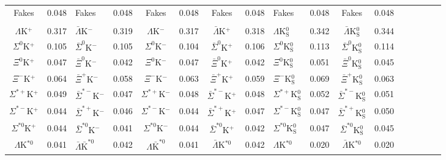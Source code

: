\documentclass[/home/jesse/Analysis/FemtoAnalysis/AnalysisNotes/AnalysisNoteJBuxton.tex]{subfiles}
\begin{document}
\begin{landscape}
\begin{table}[htbp]
{\begin{tabular}{|c|cV{5.0}c|cV{5.0}c|cV{5.0}c|cV{5.0}c|cV{5.0}c|c|}
  Fakes & 0.048 & Fakes & 0.048 & Fakes & 0.048 & Fakes & 0.048 & Fakes & 0.048 & Fakes & 0.048 \\
  
   \\
  $\Lambda$K$^{+}$ & 0.317 & $\bar{\Lambda}$K$^{-}$ & 0.319 & $\Lambda$K$^{-}$ & 0.317 & $\bar{\Lambda}$K$^{+}$ & 0.318 & $\Lambda$K$^{0}_{\mathrm{S}}$ & 0.342 & $\bar{\Lambda}$K$^{0}_{\mathrm{S}}$ & 0.344 \\
  
  $\Sigma^{0}$K$^{+}$ & 0.105 & $\bar{\Sigma}^{0}$K$^{-}$ & 0.105 & $\Sigma^{0}$K$^{-}$ & 0.104 & $\bar{\Sigma}^{0}$K$^{+}$ & 0.106 & $\Sigma^{0}$K$^{0}_{\mathrm{S}}$ & 0.113 & $\bar{\Sigma}^{0}$K$^{0}_{\mathrm{S}}$ & 0.114 \\
  
  $\Xi^{0}$K$^{+}$ & 0.047 & $\bar{\Xi}^{0}$K$^{-}$ & 0.042 & $\Xi^{0}$K$^{-}$ & 0.047 & $\bar{\Xi}^{0}$K$^{+}$ & 0.042 & $\Xi^{0}$K$^{0}_{\mathrm{S}}$ & 0.051 & $\bar{\Xi}^{0}$K$^{0}_{\mathrm{S}}$ & 0.045 \\
  
  $\Xi^{-}$K$^{+}$ & 0.064 & $\bar{\Xi}^{+}$K$^{-}$ & 0.058 & $\Xi^{-}$K$^{-}$ & 0.063 & $\bar{\Xi}^{+}$K$^{+}$ & 0.059 & $\Xi^{-}$K$^{0}_{\mathrm{S}}$ & 0.069 & $\bar{\Xi}^{+}$K$^{0}_{\mathrm{S}}$ & 0.063 \\
  
  $\Sigma^{*+}$K$^{+}$ & 0.049 & $\bar{\Sigma}^{*-}$K$^{-}$ & 0.047 & $\Sigma^{*+}$K$^{-}$ & 0.048 & $\bar{\Sigma}^{*-}$K$^{+}$ & 0.048 & $\Sigma^{*+}$K$^{0}_{\mathrm{S}}$ & 0.052 & $\bar{\Sigma}^{*-}$K$^{0}_{\mathrm{S}}$ & 0.051 \\
  
  $\Sigma^{*-}$K$^{+}$ & 0.044 & $\bar{\Sigma}^{*+}$K$^{-}$ & 0.046 & $\Sigma^{*-}$K$^{-}$ & 0.044 & $\bar{\Sigma}^{*+}$K$^{+}$ & 0.047 & $\Sigma^{*-}$K$^{0}_{\mathrm{S}}$ & 0.047 & $\bar{\Sigma}^{*+}$K$^{0}_{\mathrm{S}}$ & 0.050 \\
  
  $\Sigma^{*0}$K$^{+}$ & 0.044 & $\bar{\Sigma}^{*0}$K$^{-}$ & 0.041 & $\Sigma^{*0}$K$^{-}$ & 0.044 & $\bar{\Sigma}^{*0}$K$^{+}$ & 0.042 & $\Sigma^{*0}$K$^{0}_{\mathrm{S}}$ & 0.047 & $\bar{\Sigma}^{*0}$K$^{0}_{\mathrm{S}}$ & 0.045 \\
  
  $\Lambda$K$^{*0}$ & 0.041 & $\bar{\Lambda}\bar{\mathrm{K}}^{*0}$ & 0.042 & $\Lambda\bar{\mathrm{K}}^{*0}$ & 0.041 & $\bar{\Lambda}$K$^{*0}$ & 0.042 & $\Lambda$K$^{*0}$ & 0.020 & $\bar{\Lambda}$K$^{*0}$ & 0.020 \\
  

\end{tabular}}
\end{table}
\end{landscape}
\end{document}
